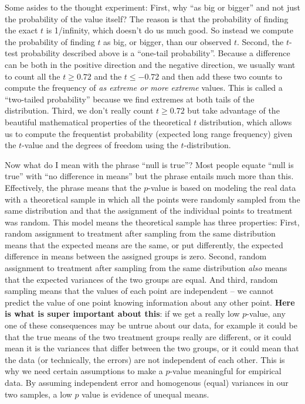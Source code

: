 \documentclass[]{book}
\begin{document}
Some asides to the thought experiment: First, why ``as big or bigger''
and not just the probability of the value itself? The reason is that the
probability of finding the exact \(t\) is 1/infinity, which doesn't do
us much good. So instead we compute the probability of finding \(t\) as
big, or bigger, than our observed \(t\). Second, the \(t\)-test
probability described above is a ``one-tail probability''. Because a
difference can be both in the positive direction and the negative
direction, we usually want to count all the \(t \ge 0.72\) and the
\(t \le -0.72\) and then add these two counts to compute the frequency
of \emph{as extreme or more extreme} values. This is called a
``two-tailed probability'' because we find extremes at both tails of the
distribution. Third, we don't really count \(t \ge 0.72\) but take
advantage of the beautiful mathematical properties of the theoretical
\(t\) distribution, which allows us to compute the frequentist
probability (expected long range frequency) given the \(t\)-value and
the degrees of freedom using the \(t\)-distribution.

Now what do I mean with the phrase ``null is true''? Most people equate
``null is true'' with ``no difference in means'' but the phrase entails
much more than this. Effectively, the phrase means that the \(p\)-value
is based on modeling the real data with a theoretical sample in which
all the points were randomly sampled from the same distribution and that
the assignment of the individual points to treatment was random. This
model means the theoretical sample has three properties: First, random
assignment to treatment after sampling from the same distribution means
that the expected means are the same, or put differently, the expected
difference in means between the assigned groups is zero. Second, random
assignment to treatment after sampling from the same distribution
\emph{also} means that the expected variances of the two groups are
equal. And third, random sampling means that the values of each point
are independent -- we cannot predict the value of one point knowing
information about any other point. \textbf{Here is what is super
important about this}: if we get a really low \(p\)-value, any one of
these consequences may be untrue about our data, for example it could be
that the true means of the two treatment groups really are different, or
it could mean it is the variances that differ between the two groups, or
it could mean that the data (or technically, the errors) are not
independent of each other. This is why we need certain assumptions to
make a \(p\)-value meaningful for empirical data. By assuming
independent error and homogenous (equal) variances in our two samples, a
low \(p\) value is evidence of unequal means.
\end{document}

